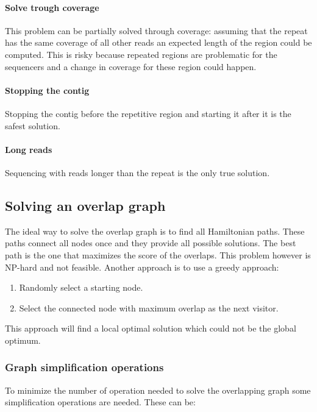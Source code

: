             \paragraph{Solve trough coverage}
            This problem can be partially solved through coverage: assuming that the repeat has the same coverage of all other reads an expected length of the region could be computed.
            This is risky because repeated regions are problematic for the sequencers and a change in coverage for these region could happen.

            \paragraph{Stopping the contig}
            Stopping the contig before the repetitive region and starting it after it is the safest solution.

            \paragraph{Long reads}
            Sequencing with reads longer than the repeat is the only true solution.

\subsection{Solving an overlap graph}
The ideal way to solve the overlap graph is to find all Hamiltonian paths.
These paths connect all nodes once and they provide all possible solutions.
The best path is the one that maximizes the score of the overlaps.
This problem however is NP-hard and not feasible.
Another approach is to use a greedy approach:

\begin{multicols}{2}
    \begin{enumerate}
        \item Randomly select a starting node.
        \item Select the connected node with maximum overlap as the next visitor.
    \end{enumerate}
\end{multicols}

This approach will find a local optimal solution which could not be the global optimum.

\subsubsection{Graph simplification operations}
To minimize the number of operation needed to solve the overlapping graph some simplification operations are needed.
These can be:


